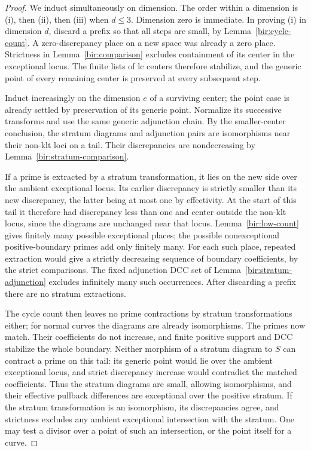 \begin{proof}
We induct simultaneously on dimension.  The order within a
dimension is (i), then (ii), then (iii) when $d\leq3$.  Dimension
zero is immediate.  In proving (i) in dimension $d$, discard a
prefix so that all steps are small, by
Lemma~\ref{bir:cycle-count}.  A zero-discrepancy place on a new
space was already a zero place.  Strictness in
Lemma~\ref{bir:comparison} excludes containment of its center in
the exceptional locus.  The finite lists of lc centers therefore
stabilize, and the generic point of every remaining center is
preserved at every subsequent step.

Induct increasingly on the dimension $e$ of a surviving center;
the point case is already settled by preservation of its generic
point.  Normalize its successive transforms and use the same
generic adjunction chain.  By the smaller-center conclusion, the
stratum diagrams and adjunction pairs are isomorphisms near their
non-klt loci on a tail.  Their discrepancies are nondecreasing by
Lemma~\ref{bir:stratum-comparison}.

If a prime is extracted by a stratum transformation, it lies on
the new side over the ambient exceptional locus.  Its earlier
discrepancy is strictly smaller than its new discrepancy, the latter
being at most one by effectivity.  At the start of this tail it
therefore had discrepancy less than one and center outside the
non-klt locus, since the diagrams are unchanged near that locus.
Lemma~\ref{bir:low-count} gives finitely many possible exceptional
places; the possible nonexceptional positive-boundary primes add
only finitely many.  For each such place, repeated extraction would
give a strictly decreasing sequence of boundary coefficients, by
the strict comparisons.  The fixed adjunction DCC set of
Lemma~\ref{bir:stratum-adjunction} excludes infinitely many such
occurrences.  After discarding a prefix there are no stratum
extractions.

The cycle count then leaves no prime contractions by stratum
transformations either; for normal curves the diagrams are already
isomorphisms.  The primes now match.  Their coefficients do not
increase, and finite positive support and DCC stabilize the whole
boundary.  Neither morphism of a stratum diagram to $S$ can
contract a prime on this tail: its generic point would lie over
the ambient exceptional locus, and strict discrepancy increase
would contradict the matched coefficients.  Thus the stratum
diagrams are small, allowing isomorphisms, and their effective
pullback differences are exceptional over the positive stratum.
If the stratum transformation is an isomorphism, its discrepancies
agree, and strictness excludes any ambient exceptional intersection
with the stratum.  One may test a divisor over a point of such an
intersection, or the point itself for a curve.


\end{proof}
